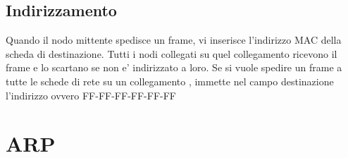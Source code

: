 \subsection{Indirizzamento}
Quando il nodo mittente spedisce un frame, vi inserisce l'indirizzo MAC della scheda di destinazione. Tutti i nodi collegati su quel collegamento ricevono il frame e lo scartano se non e' indirizzato a loro. Se si vuole spedire un frame a tutte le schede di rete su un collegamento , immette nel campo destinazione l'indirizzo  ovvero FF-FF-FF-FF-FF-FF
\section{ARP}
